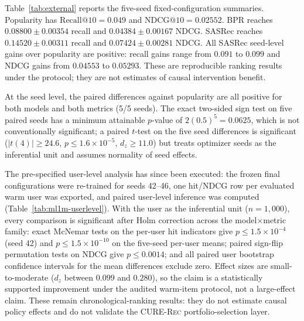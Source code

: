 \documentclass[pdflatex,sn-mathphys-num]{sn-jnl}
\makeatletter
\theoremstyle{thmstyleone}
\theoremstyle{thmstyletwo}
\theoremstyle{thmstylethree}
\newcommand{\NDCG}{\mathrm{NDCG@10}}
\newcommand{\Recall}{\mathrm{Recall@10}}
\newcommand{\CURE}{\textsc{CURE-Rec}}
\makeatother
\begin{document}
Table~\ref{tab:external} reports the five-seed fixed-configuration summaries. Popularity has $\Recall=0.049$ and $\NDCG=0.02552$. BPR reaches $0.08800\pm0.00354$ recall and $0.04384\pm0.00167$ NDCG. SASRec reaches $0.14520\pm0.00311$ recall and $0.07424\pm0.00281$ NDCG. All SASRec seed-level gains over popularity are positive: recall gains range from $0.091$ to $0.099$ and NDCG gains from $0.04553$ to $0.05293$. These are reproducible ranking results under the protocol; they are not estimates of causal intervention benefit.

At the seed level, the paired differences against popularity are all positive for both models and both metrics (5/5 seeds). The exact two-sided sign test on five paired seeds has a minimum attainable $p$-value of $2(0.5)^5=0.0625$, which is not conventionally significant; a paired $t$-test on the five seed differences is significant ($|t(4)|\geq24.6$, $p\leq1.6\times10^{-5}$, $d_z\geq11.0$) but treats optimizer seeds as the inferential unit and assumes normality of seed effects.

The pre-specified user-level analysis has since been executed: the frozen final configurations were re-trained for seeds 42--46, one hit/NDCG row per evaluated warm user was exported, and paired user-level inference was computed (Table~\ref{tab:ml1m-userlevel}). With the user as the inferential unit ($n=1{,}000$), every comparison is significant after Holm correction across the model$\times$metric family: exact McNemar tests on the per-user hit indicators give $p\leq1.5\times10^{-4}$ (seed 42) and $p\leq1.5\times10^{-10}$ on the five-seed per-user means; paired sign-flip permutation tests on NDCG give $p\leq0.0014$; and all paired user bootstrap confidence intervals for the mean differences exclude zero. Effect sizes are small-to-moderate ($d_z$ between $0.099$ and $0.280$), so the claim is a statistically supported improvement under the audited warm-item protocol, not a large-effect claim. These remain chronological-ranking results: they do not estimate causal policy effects and do not validate the \CURE{} portfolio-selection layer.
\end{document}
